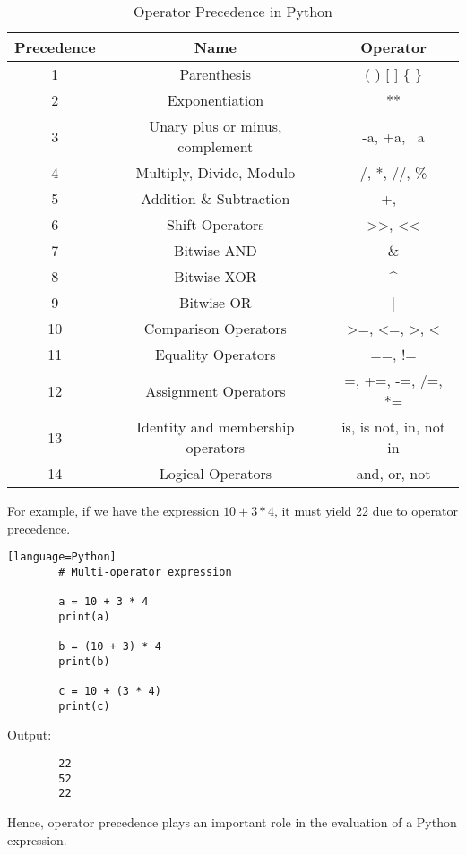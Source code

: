 \documentclass{article}
\begin{document}
	\begin{table}[h]
		\centering
		\begin{tabular}{|c|c|c|}
			\hline
			Precedence & Name                              & Operator \\
			\hline
			1          & Parenthesis                        & ( ) [ ] \{ \} \\
			2          & Exponentiation                     & ** \\
			3          & Unary plus or minus, complement    & -a, +a, ~a \\
			4          & Multiply, Divide, Modulo           & /, *, //, \% \\
			5          & Addition \& Subtraction            & +, - \\
			6          & Shift Operators                    & >>, << \\
			7          & Bitwise AND                        & \& \\
			8          & Bitwise XOR                        & \^{} \\
			9          & Bitwise OR                         & | \\
			10         & Comparison Operators               & >=, <=, >, < \\
			11         & Equality Operators                 & ==, != \\
			12         & Assignment Operators               & =, +=, -=, /=, *= \\
			13         & Identity and membership operators  & is, is not, in, not in \\
			14         & Logical Operators                  & and, or, not \\
			\hline
		\end{tabular}
		\caption{Operator Precedence in Python}
	\end{table}
	
	For example, if we have the expression $10 + 3 * 4$, it must yield 22 due to operator precedence.
	
	\begin{verbatim}[language=Python]
		# Multi-operator expression 
		
		a = 10 + 3 * 4
		print(a) 
		
		b = (10 + 3) * 4
		print(b) 
		
		c = 10 + (3 * 4) 
		print(c)
	\end{verbatim}
	
	Output:
	\begin{verbatim}
		22
		52
		22
	\end{verbatim}
	
	Hence, operator precedence plays an important role in the evaluation of a Python expression.
	
\end{document}
